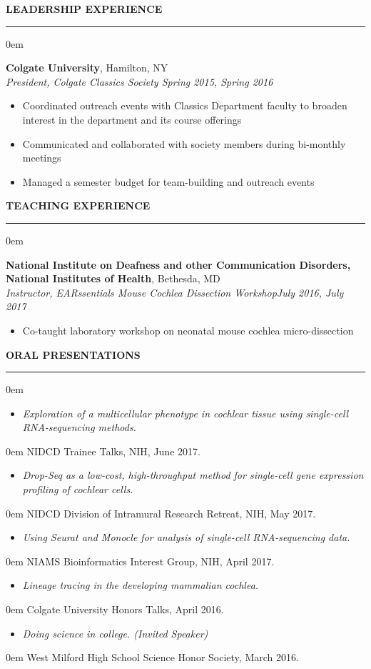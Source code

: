 \documentclass[11pt, letterpaper]{article}
\newenvironment{CVSection}{
\begin{addmargin}[2em]{0em}
\begin{samepage}}
{\end{samepage}
\end{addmargin}\bigskip}
\newcommand{\CVList}[2]{
\begin{samepage}
\begin{itemize}[leftmargin=*]
\item \textsl{#1}
\end{itemize}
\begin{addmargin}[2.5em]{0em}
#2
\end{addmargin}
\end{samepage}
}
\newcommand{\CVHeading}[1]{
\MakeUppercase{\bf #1}
\smallskip
\hrule
\medskip
}
\begin{document}
\CVHeading{Leadership Experience}
\begin{CVSection}
\textbf{Colgate University}, Hamilton, NY\\
\textsl{President, Colgate Classics Society	\hfill Spring 2015, Spring 2016}
\begin{itemize}
\item Coordinated outreach events with Classics Department faculty to broaden interest in the department and its course offerings
\item Communicated and collaborated with society members during bi-monthly meetings
\item Managed a semester budget for team-building and outreach events
\end{itemize}
\end{CVSection}

\CVHeading{Teaching Experience}
\begin{CVSection}
\textbf{National Institute on Deafness and other Communication Disorders,\\ National Institutes of Health}, Bethesda, MD\\
\textsl{Instructor, EARssentials Mouse Cochlea Dissection Workshop\hfill July 2016, July 2017}
\begin{itemize}
\item Co-taught laboratory workshop on neonatal mouse cochlea micro-dissection
\end{itemize}
\end{CVSection}

\CVHeading{Oral Presentations}
\begin{CVSection}
\CVList{Exploration of a multicellular phenotype in cochlear tissue using single-cell RNA-sequencing methods.}{NIDCD Trainee Talks, NIH, June 2017.}
\CVList{Drop-Seq as a low-cost, high-throughput method for single-cell gene expression profiling of cochlear cells.}{NIDCD Division of Intramural Research Retreat, NIH, May 2017.}
\CVList{Using Seurat and Monocle for analysis of single-cell RNA-sequencing data.}{NIAMS Bioinformatics Interest Group, NIH, April 2017.}
\CVList{Lineage tracing in the developing mammalian cochlea.}{Colgate University Honors Talks, April 2016.}
\CVList{Doing science in college. \textnormal{(Invited Speaker)}}{West Milford High School Science Honor Society, March 2016.}
\end{CVSection}
\end{document}
